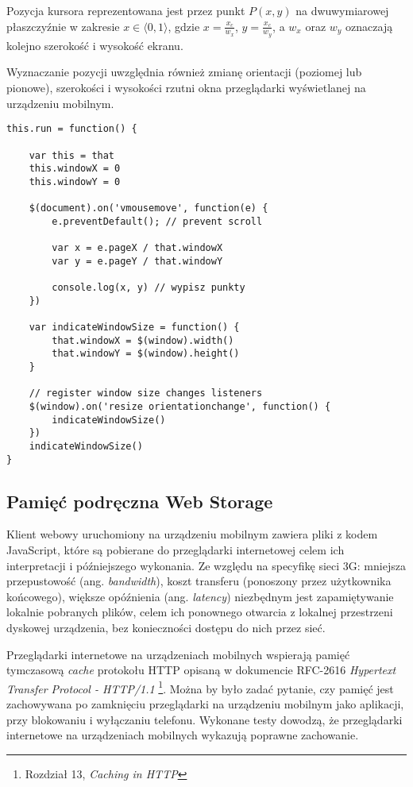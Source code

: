 Pozycja kursora reprezentowana jest przez punkt \(P(x, y)\) na dwuwymiarowej płaszczyźnie w zakresie \( x\in \langle0, 1\rangle \), gdzie \(x = \frac{x_{c}}{w_{x}}\), \(y = \frac{x_{c}}{w_{y}}\), a \(w_{x}\) oraz \(w_{y}\) oznaczają kolejno szerokość i wysokość ekranu.

Wyznaczanie pozycji uwzględnia również zmianę orientacji (poziomej lub pionowe), szerokości i wysokości rzutni okna przeglądarki wyświetlanej na urządzeniu mobilnym.

\lstset{language=JavaScript}
\begin{lstlisting}
this.run = function() {
	
	var this = that
	this.windowX = 0
	this.windowY = 0
	
	$(document).on('vmousemove', function(e) {
		e.preventDefault(); // prevent scroll
		
		var x = e.pageX / that.windowX
		var y = e.pageY / that.windowY
		
		console.log(x, y) // wypisz punkty
	})
	
	var indicateWindowSize = function() {
		that.windowX = $(window).width()
		that.windowY = $(window).height()
	}
	
	// register window size changes listeners
	$(window).on('resize orientationchange', function() {
		indicateWindowSize()
	})
	indicateWindowSize()
}
\end{lstlisting}

\subsection{Pamięć podręczna Web Storage}

Klient webowy uruchomiony na urządzeniu mobilnym zawiera pliki z kodem JavaScript, które są pobierane do przeglądarki internetowej celem ich interpretacji i późniejszego wykonania. Ze względu na specyfikę sieci 3G: mniejsza przepustowość (ang. \emph{bandwidth}), koszt transferu (ponoszony przez użytkownika końcowego), większe opóźnienia (ang. \emph{latency}) niezbędnym jest zapamiętywanie lokalnie pobranych plików, celem ich ponownego otwarcia z lokalnej przestrzeni dyskowej urządzenia, bez konieczności dostępu do nich przez sieć.

Przeglądarki internetowe na urządzeniach mobilnych wspierają pamięć tymczasową \emph{cache} protokołu HTTP opisaną w dokumencie RFC-2616 \emph{Hypertext Transfer Protocol - HTTP/1.1}\cite{http-rfc} \footnote{Rozdział 13, \emph{Caching in HTTP}}. Można by było zadać pytanie, czy pamięć jest zachowywana po zamknięciu przeglądarki na urządzeniu mobilnym jako aplikacji, przy blokowaniu i wyłączaniu telefonu. Wykonane testy dowodzą, że przeglądarki internetowe na urządzeniach mobilnych wykazują poprawne zachowanie\cite{http-cache-mobile-benchmark}.

